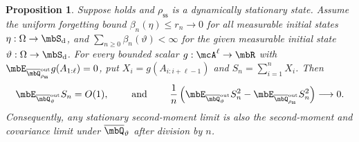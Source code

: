 \documentclass[a4paper]{article}
\numberwithin{equation}{section}   %
\theoremstyle{plain}   %
\theoremstyle{plain}   %
\newtheorem{prop}[lemma]{Proposition}   %
\theoremstyle{examplestyle}
\DeclareMathOperator{\states}{\mbS_d}   %
\newcommand{\s}{\rho_{\mathsf{ss}}}     %
\begin{document}
\begin{prop}
\label{univ:prop:moments}
    Suppose  holds and $\s$ is a dynamically stationary state. 
    Assume the uniform forgetting bound $\beta_n(\eta)\le r_n\to0$ for all measurable initial states $\eta:\Omega\to\states$, and $\sum_{n\ge0}\beta_n(\vartheta)<\infty$ for the given measurable initial state $\vartheta:\Omega\to\states$. 
    For every bounded scalar $g:\mcA^\ell\to\mbR$ with $\mbE_{\overline\mbQ^{\mathrm{out}}_{\s}} g(A_{1:\ell})=0$, put $X_i=g(A_{i:i+\ell-1})$ and $S_n=\sum_{i=1}^nX_i$. Then
    \[
     \mbE_{ \overline\mbQ^{\mathrm{out}}_\vartheta} S_n=O(1),
     \qquad \text{ and }\qquad
     \frac1n\left(\mbE_{ \overline\mbQ^{\mathrm{out}}_\vartheta} S_n^2-\mbE_{ \overline\mbQ^{\mathrm{out}}_{\s}} S_n^2\right)\longrightarrow0.
    \]
    Consequently, any stationary second-moment limit is also the second-moment and covariance limit under $\overline\mbQ_\vartheta$ after division by $n$.
\end{prop}
\end{document}
